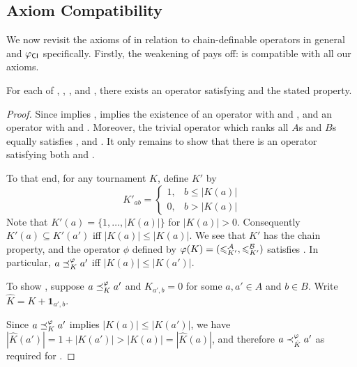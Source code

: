 \subsection{Axiom Compatibility}

We now revisit the axioms of  in relation to
chain-definable operators in general and ${\varphi_{\mathsf{CI}}}$ specifically. Firstly,
the weakening of  pays off:  is
compatible with all our axioms.

\begin{theorem}
    \label{tourn_result_chaindef_axiom_compatibilities}

    For each of , , ,
     and , there exists an operator satisfying
     and the stated property.

\end{theorem}

\begin{proof}

    Since  implies ,
     implies the existence of an
    operator with  and , and an operator
    with  and .  Moreover, the trivial
    operator which ranks all $A$s and $B$s equally satisfies
    , 
    and . It only remains to show that there is an operator
    satisfying both  and .

    To that end, for any tournament $K$, define $K'$ by
    \[
        K'_{ab} = \begin{cases}
            1 ,& b \le |K(a)| \\
            0 ,& b > |K(a)|
        \end{cases}
    \]
    Note that $K'(a) = \{1,\ldots,|K(a)|\}$ for $|K(a)| > 0$. Consequently
    $K'(a) \subseteq K'(a')$ iff $|K(a)| \le |K(a)|$. We see that $K'$ has the
    chain property, and the operator $\phi$ defined by $\varphi(K) =
    ({\leqslant^{\mathcal{A}}_{K'}}, {\leqslant^{\mathcal{B}}_{K'}})$ satisfies . In
    particular, $a \preceq_K^\varphi a'$ iff $|K(a)| \le |K(a')|$.

    To show , suppose $a \preceq_K^\varphi a'$ and $K_{a',b} = 0$
    for some $a, a' \in A$ and $b \in B$. Write $\hat{K} = K + \bm{1}_{a',b}$.

    Since $a \preceq_K^\varphi a'$ implies $|K(a)| \le |K(a')|$, we have
    $|\hat{K}(a')| = 1 + |K(a')| > |K(a)| = |\hat{K}(a)|$, and therefore $a
    \prec_{\hat{K}}^\varphi a'$ as required for .
\end{proof}

